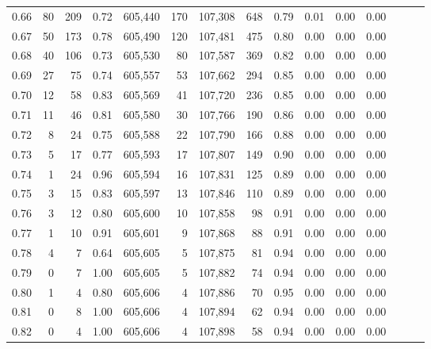 \begin{tabular}{rrrrrrrrrrrrrrr}
0.66 &      80 &    209 &  0.72 &  605,440 &      170 &  107,308 &      648 &  0.79 &  0.01 &  0.00 &      0.00 \\
0.67 &      50 &    173 &  0.78 &  605,490 &      120 &  107,481 &      475 &  0.80 &  0.00 &  0.00 &      0.00 \\
0.68 &      40 &    106 &  0.73 &  605,530 &       80 &  107,587 &      369 &  0.82 &  0.00 &  0.00 &      0.00 \\
0.69 &      27 &     75 &  0.74 &  605,557 &       53 &  107,662 &      294 &  0.85 &  0.00 &  0.00 &      0.00 \\
0.70 &      12 &     58 &  0.83 &  605,569 &       41 &  107,720 &      236 &  0.85 &  0.00 &  0.00 &      0.00 \\
0.71 &      11 &     46 &  0.81 &  605,580 &       30 &  107,766 &      190 &  0.86 &  0.00 &  0.00 &      0.00 \\
0.72 &       8 &     24 &  0.75 &  605,588 &       22 &  107,790 &      166 &  0.88 &  0.00 &  0.00 &      0.00 \\
0.73 &       5 &     17 &  0.77 &  605,593 &       17 &  107,807 &      149 &  0.90 &  0.00 &  0.00 &      0.00 \\
0.74 &       1 &     24 &  0.96 &  605,594 &       16 &  107,831 &      125 &  0.89 &  0.00 &  0.00 &      0.00 \\
0.75 &       3 &     15 &  0.83 &  605,597 &       13 &  107,846 &      110 &  0.89 &  0.00 &  0.00 &      0.00 \\
0.76 &       3 &     12 &  0.80 &  605,600 &       10 &  107,858 &       98 &  0.91 &  0.00 &  0.00 &      0.00 \\
0.77 &       1 &     10 &  0.91 &  605,601 &        9 &  107,868 &       88 &  0.91 &  0.00 &  0.00 &      0.00 \\
0.78 &       4 &      7 &  0.64 &  605,605 &        5 &  107,875 &       81 &  0.94 &  0.00 &  0.00 &      0.00 \\
0.79 &       0 &      7 &  1.00 &  605,605 &        5 &  107,882 &       74 &  0.94 &  0.00 &  0.00 &      0.00 \\
0.80 &       1 &      4 &  0.80 &  605,606 &        4 &  107,886 &       70 &  0.95 &  0.00 &  0.00 &      0.00 \\
0.81 &       0 &      8 &  1.00 &  605,606 &        4 &  107,894 &       62 &  0.94 &  0.00 &  0.00 &      0.00 \\
0.82 &       0 &      4 &  1.00 &  605,606 &        4 &  107,898 &       58 &  0.94 &  0.00 &  0.00 &      0.00 \\

\end{tabular}
